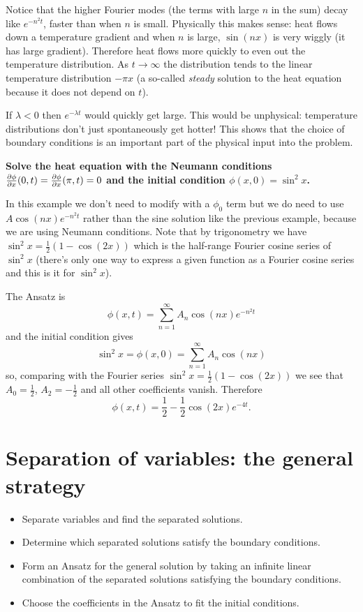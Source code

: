 \begin{rmk}
Notice that the higher Fourier modes (the terms with large $n$ in the sum) decay like $e^{-n^2t}$, faster than when $n$ is small. Physically this makes sense: heat flows down a temperature gradient and when $n$ is large, $\sin(nx)$ is very wiggly (it has large gradient). Therefore heat flows more quickly to even out the temperature distribution. As $t\to\infty$ the distribution tends to the linear temperature distribution $-\pi x$ (a so-called {\em steady} solution to the heat equation because it does not depend on $t$).
\end{rmk}
\begin{rmk}
If $\lambda<0$ then $e^{-\lambda t}$ would quickly get large. This would be unphysical: temperature distributions don't just spontaneously get hotter! This shows that the choice of boundary conditions is an important part of the physical input into the problem.
\end{rmk}

\begin{exm}
{\bf Solve the heat equation with the Neumann conditions $\frac{\partial \phi}{\partial x}(0,t)=\frac{\partial \phi}{\partial x}(\pi,t)=0$ and the initial condition $\phi(x,0)=\sin^2x$.}

In this example we don't need to modify with a $\phi_0$ term but we do need to use $A\cos(nx)e^{-n^2t}$ rather than the sine solution like the previous example, because we are using Neumann conditions. Note that by trigonometry we have $\sin^2x=\frac{1}{2}(1-\cos(2x))$ which is the half-range Fourier cosine series of $\sin^2x$ (there's only one way to express a given function as a Fourier cosine series and this is it for $\sin^2x$).

The Ansatz is
\[\phi(x,t)=\sum_{n=1}^{\infty}A_n\cos(nx)e^{-n^2t}\]
and the initial condition gives
\[\sin^2x=\phi(x,0)=\sum_{n=1}^{\infty}A_n\cos(nx)\]
so, comparing with the Fourier series $\sin^2x=\frac{1}{2}(1-\cos(2x))$ we see that $A_0=\frac{1}{2}$, $A_2=-\frac{1}{2}$ and all other coefficients vanish. Therefore
\[\phi(x,t)=\frac{1}{2}-\frac{1}{2}\cos(2x)e^{-4t}.\]
\end{exm}

\section{Separation of variables: the general strategy}

\begin{itemize}
\item Separate variables and find the separated solutions.
\item Determine which separated solutions satisfy the boundary conditions.
\item Form an Ansatz for the general solution by taking an infinite linear combination of the separated solutions satisfying the boundary conditions.
\item Choose the coefficients in the Ansatz to fit the initial conditions.
\end{itemize}

